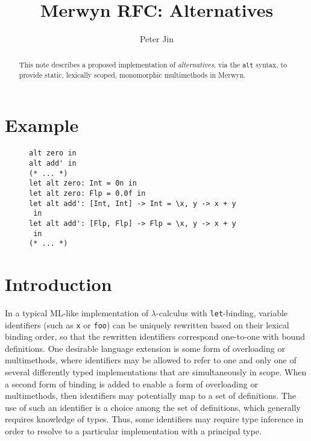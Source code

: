 \documentclass{article}
\title{Merwyn RFC: Alternatives}
\author{Peter Jin}
\renewcommand{\=}{\triangleq}
\begin{document}
\maketitle

\begin{abstract}
This note describes a proposed implementation of \emph{alternatives},
via the \texttt{alt} syntax, to provide static, lexically scoped, monomorphic
multimethods in Merwyn.
\end{abstract}

\section{Example}

\begin{figure}[h]
\centering
\begin{varwidth}{\linewidth}
\begin{verbatim}
alt zero in
alt add' in
(* ... *)
let alt zero: Int = 0n in
let alt zero: Flp = 0.0f in
let alt add': [Int, Int] -> Int = \x, y -> x + y
 in
let alt add': [Flp, Flp] -> Flp = \x, y -> x + y
 in
(* ... *)
\end{verbatim}
\end{varwidth}
\end{figure}

\section{Introduction}

In a typical ML-like implementation of $\lambda$-calculus with
\texttt{let}-binding,
variable identifiers (such as \texttt{x} or \texttt{foo})
can be uniquely rewritten based on their lexical binding order,
so that the rewritten identifiers correspond one-to-one with bound definitions.
One desirable language extension is some form of overloading or multimethods,
where
identifiers may be allowed to refer to one and only one of several differently
typed implementations that are simultaneously in scope.
When a second form of binding is added to enable a form of overloading or
multimethods,
then identifiers may potentially map to a set of definitions.
The use of such an identifier is a choice among the set of definitions,
which generally requires knowledge of types.
Thus, some identifiers may require type inference in order to resolve to a
particular implementation with a principal type.
\end{document}
